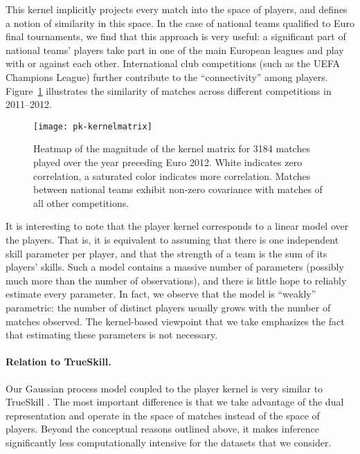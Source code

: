 This kernel implicitly projects every match into the space of players, and defines a notion of similarity in this space.
In the case of national teams qualified to Euro final tournaments, we find that this approach is very useful: a significant part of national teams' players take part in one of the main European leagues and play with or against each other.
International club competitions (such as the UEFA Champions League) further contribute to the ``connectivity'' among players.
Figure~\ref{fig:kernel} illustrates the similarity of matches across different competitions in 2011--2012.


\begin{figure}[t]
  \centering
  \texttt{[image: pk-kernelmatrix]}
  \caption{Heatmap of the magnitude of the kernel matrix for \num{3184} matches played over the year preceding Euro 2012.
White indicates zero correlation, a saturated color indicates more correlation.
Matches between national teams exhibit non-zero covariance with matches of all other competitions.
}
  \label{fig:kernel}
  \vspace{-0.1cm}
\end{figure}

It is interesting to note that the player kernel corresponds to a linear model over the players.
That is, it is equivalent to assuming that there is one independent skill parameter per player, and that the strength of a team is the sum of its players' skills.
Such a model contains a massive number of parameters (possibly much more than the number of observations), and there is little hope to reliably estimate every parameter.
In fact, we observe that the model is ``weakly'' parametric: the number of distinct players usually grows with the number of matches observed.
The kernel-based viewpoint that we take emphasizes the fact that estimating these parameters is not necessary.

\paragraph{Relation to TrueSkill.}
Our Gaussian process model coupled to the player kernel is very similar to TrueSkill \cite{herbrich2006trueskill}.
The most important difference is that we take advantage of the dual representation and operate in the space of matches instead of the space of players.
Beyond the conceptual reasons outlined above, it makes inference significantly less computationally intensive for the datasets that we consider.
